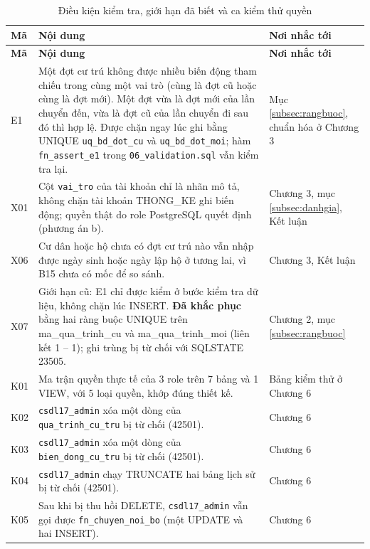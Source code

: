 {\fontsize{11pt}{13pt}\selectfont
\renewcommand{\arraystretch}{1.10}
\begin{longtable}{@{}P{1.15cm}P{8.5cm}P{4.4cm}@{}}
\caption{Điều kiện kiểm tra, giới hạn đã biết và ca kiểm thử quyền}\label{tab:makhac}\\
\hline
{}
\textbf{Mã} & \textbf{Nội dung} & \textbf{Nơi nhắc tới} \\
\hline
\endfirsthead
\hline
{}
\textbf{Mã} & \textbf{Nội dung} & \textbf{Nơi nhắc tới} \\
\hline
\endhead
\hline
\endfoot
E1 & Một đợt cư trú không được nhiều biến động tham chiếu trong cùng một vai trò (cùng là đợt cũ hoặc cùng là đợt mới). Một đợt vừa là đợt mới của lần chuyển đến, vừa là đợt cũ của lần chuyển đi sau đó thì hợp lệ. Được chặn ngay lúc ghi bằng UNIQUE \texttt{uq\_bd\_dot\_cu} và \texttt{uq\_bd\_dot\_moi}; hàm \texttt{fn\_assert\_e1} trong \texttt{06\_validation.sql} vẫn kiểm tra lại. & Mục \ref{subsec:rangbuoc}, chuẩn hóa ở Chương 3 \\
X01 & Cột \texttt{vai\_tro} của tài khoản chỉ là nhãn mô tả, không chặn tài khoản THONG\_KE ghi biến động; quyền thật do role PostgreSQL quyết định (phương án b). & Chương 3, mục \ref{subsec:danhgia}, Kết luận \\
X06 & Cư dân hoặc hộ chưa có đợt cư trú nào vẫn nhập được ngày sinh hoặc ngày lập hộ ở tương lai, vì B15 chưa có mốc để so sánh. & Chương 3, Kết luận \\
X07 & Giới hạn cũ: E1 chỉ được kiểm ở bước kiểm tra dữ liệu, không chặn lúc INSERT. \textbf{Đã khắc phục} bằng hai ràng buộc UNIQUE trên ma\_qua\_trinh\_cu và ma\_qua\_trinh\_moi (liên kết 1 -- 1); ghi trùng bị từ chối với SQLSTATE 23505. & Chương 2, mục \ref{subsec:rangbuoc} \\
K01 & Ma trận quyền thực tế của 3 role trên 7 bảng và 1 VIEW, với 5 loại quyền, khớp đúng thiết kế. & Bảng kiểm thử ở Chương 6 \\
K02 & \texttt{csdl17\_admin} xóa một dòng của \texttt{qua\_trinh\_cu\_tru} bị từ chối (42501). & Chương 6 \\
K03 & \texttt{csdl17\_admin} xóa một dòng của \texttt{bien\_dong\_cu\_tru} bị từ chối (42501). & Chương 6 \\
K04 & \texttt{csdl17\_admin} chạy TRUNCATE hai bảng lịch sử bị từ chối (42501). & Chương 6 \\
K05 & Sau khi bị thu hồi DELETE, \texttt{csdl17\_admin} vẫn gọi được \texttt{fn\_chuyen\_noi\_bo} (một UPDATE và hai INSERT). & Chương 6 \\
\end{longtable}
}
